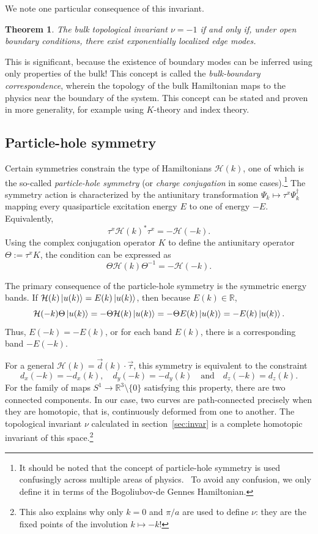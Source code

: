 \documentclass{article}
\newtheorem{theorem}{Theorem}[section]
\begin{document}
We note one particular consequence of this invariant.
\begin{theorem}
    The bulk topological invariant $\nu = -1$ if and only if, under open boundary conditions,
    there exist exponentially localized edge modes.
\end{theorem}
This is significant, because the existence of boundary modes can be inferred
using only properties of the bulk!
This concept is called the \emph{bulk-boundary correspondence},
wherein the topology of the bulk Hamiltonian maps to the physics near the boundary of the system.
This concept can be stated and proven in more generality, for example using $K$-theory and index theory.

\subsection{Particle-hole symmetry}\label{sec:ptcl_hole}
Certain symmetries constrain the type of Hamiltonians $\mathcal{H}(k)$,
one of which is the so-called \emph{particle-hole symmetry} (or \emph{charge conjugation} in some cases).\footnote{%
It should be noted that the concept of particle-hole symmetry is used confusingly across multiple areas of physics.~\cite{zirnbauer_ptcl_hole}
To avoid any confusion, we only define it in terms of the Bogoliubov-de Gennes Hamiltonian.
}
The symmetry action is characterized by the antiunitary transformation $\Psi_k \mapsto \tau^x \Psi_k^\dagger$
mapping every quasiparticle excitation energy $E$ to one of energy $-E$.
Equivalently,
\[
	\tau^x \mathcal{H}(k)^* \tau^x = -\mathcal{H}(-k).
\]
Using the complex conjugation operator $K$ to define the antiunitary operator $\Theta := \tau^x K$,
the condition can be expressed as
\[
	\Theta \mathcal{H}(k) \Theta^{-1} = -\mathcal{H}(-k).
\]

The primary consequence of the particle-hole symmetry is the symmetric energy bands.
If $\mathcal{H}(k)\ket{u(k)} = E(k)\ket{u(k)}$, then because $E(k) \in \mathbb{R}$,
\[
	\mathcal{H}(-k)\Theta\ket{u(k)} = -\Theta\mathcal{H}(k)\ket{u(k)} = -\Theta E(k)\ket{u(k)} = -E(k)\ket{u(k)}.
\]
Thus, $E(-k) = -E(k)$, or for each band $E(k)$, there is a corresponding band $-E(-k)$.

For a general $\mathcal{H}(k) = \vec{d}(k) \cdot \vec{\tau}$, this symmetry is equivalent to the constraint
\[
	d_x(-k) = -d_x(k),\quad d_y(-k) = -d_y(k)\quad \text{and}\quad d_z(-k) = d_z(k).
\]
For the family of maps $S^1 \rightarrow \mathbb{R}^3\setminus\{0\}$ satisfying this property, there are two connected components.
In our case, two curves are path-connected precisely when they are homotopic,
that is, continuously deformed from one to another.
The topological invariant $\nu$ calculated in section~\ref{sec:invar} is a complete homotopic invariant of this space.\footnote{%
This also explains why only $k=0$ and $\pi/a$ are used to define $\nu$:
they are the fixed points of the involution $k \mapsto -k$!
}
\end{document}
